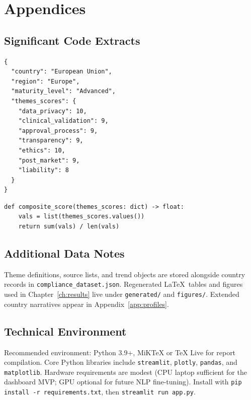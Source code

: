 \chapter{Appendices}
\label{ch:appendix}

\section{Significant Code Extracts}
\label{app:code}

\begin{lstlisting}[caption={Illustrative JSON country record fields},label=lst:json]
{
  "country": "European Union",
  "region": "Europe",
  "maturity_level": "Advanced",
  "themes_scores": {
    "data_privacy": 10,
    "clinical_validation": 9,
    "approval_process": 9,
    "transparency": 9,
    "ethics": 10,
    "post_market": 9,
    "liability": 8
  }
}
\end{lstlisting}

\begin{lstlisting}[caption={Composite score computation (conceptual)},label=lst:score]
def composite_score(themes_scores: dict) -> float:
    vals = list(themes_scores.values())
    return sum(vals) / len(vals)
\end{lstlisting}

\section{Additional Data Notes}
\label{app:data}

Theme definitions, source lists, and trend objects are stored alongside country records in \texttt{compliance\_dataset.json}. Regenerated \LaTeX\ tables and figures used in Chapter~\ref{ch:results} live under \texttt{generated/} and \texttt{figures/}. Extended country narratives appear in Appendix~\ref{app:profiles}.

\section{Technical Environment}
\label{app:env}

Recommended environment: Python 3.9+, MiKTeX or TeX Live for report compilation. Core Python libraries include \texttt{streamlit}, \texttt{plotly}, \texttt{pandas}, and \texttt{matplotlib}. Hardware requirements are modest (CPU laptop sufficient for the dashboard MVP; GPU optional for future NLP fine-tuning). Install with \texttt{pip install -r requirements.txt}, then \texttt{streamlit run app.py}.

